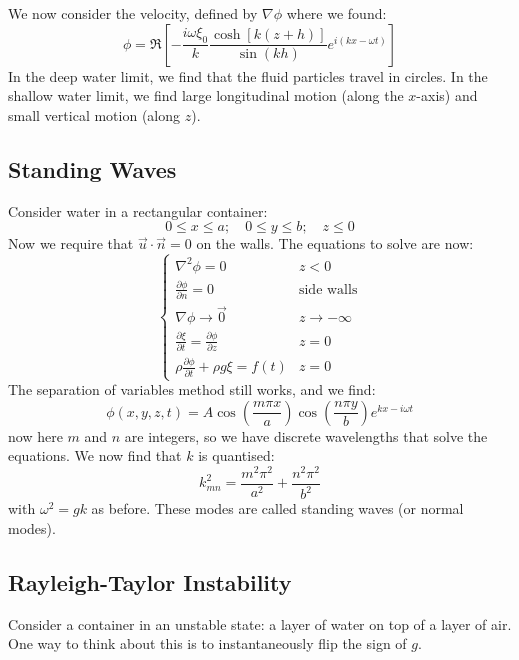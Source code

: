 \documentclass[../Main.tex]{subfiles}
\begin{document}
We now consider the velocity, defined by $\nabla \phi$ where we found:
\begin{equation*}
    \phi = \Re\left[-\frac{i\omega \xi_0}{k} \frac{\cosh[k(z+h)]}{\sin(kh)} e^{i(kx - \omega t)}\right]
\end{equation*}
In the deep water limit, we find that the fluid particles travel in circles. In the shallow water limit, we find large longitudinal motion (along the $x$-axis) and small vertical motion (along $z$).
\subsection{Standing Waves}
Consider water in a rectangular container:
\begin{equation*}
    0 \leq x \leq a;\quad 0\leq y \leq b;\quad z\leq 0
\end{equation*}
Now we require that $\vec{u} \cdot \vec{n} = 0$ on the walls. The equations to solve are now:
\begin{equation*}
    \begin{cases}
        \nabla^2 \phi = 0 & z < 0 \\
        \frac{\partial \phi}{\partial n} = 0 & \text{side walls} \\
        \nabla \phi \to \vec0 & z \to -\infty \\
        \frac{\partial \xi}{\partial t} = \frac{\partial \phi}{\partial z} & z = 0 \\
        \rho \frac{\partial \phi}{\partial t} + \rho g \xi = f(t) & z = 0
    \end{cases}
\end{equation*}
The separation of variables method still works, and we find:
\begin{equation*}
    \phi(x, y, z, t) = A \cos\left(\frac{m \pi x}{a}\right) \cos\left(\frac{n \pi y}{b}\right)e^{kx - i\omega t}
\end{equation*}
now here $m$ and $n$ are integers, so we have discrete wavelengths that solve the equations.
We now find that $k$ is quantised:
\begin{equation*}
    k_{mn}^2 = \frac{m^2 \pi^2}{a^2} + \frac{n^2 \pi^2}{b^2}
\end{equation*}
with $\omega^2 = gk$ as before. These modes are called standing waves (or normal modes).
\subsection{Rayleigh-Taylor Instability}
Consider a container in an unstable state: a layer of water on top of a layer of air. One way to think about this is to instantaneously flip the sign of $g$.
\end{document}
